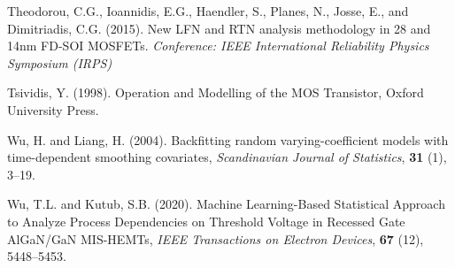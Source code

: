 \documentclass[sn-mathphys]{sn-jnl}%
\theoremstyle{thmstyleone}%
\theoremstyle{thmstyletwo}%
\theoremstyle{thmstylethree}%
\begin{document}
\begin{thebibliography}{00}
	
	 Theodorou, C.G., Ioannidis, E.G., Haendler, S., Planes, N., Josse, E., and Dimitriadis, C.G. (2015). New LFN and RTN analysis methodology in 28 and 14nm FD-SOI MOSFETs. {\it Conference: IEEE International Reliability Physics Symposium (IRPS)}
	
	
	 Tsividis, Y. (1998). Operation and Modelling of the MOS Transistor, Oxford University Press.
	
	 Wu, H. and Liang, H. (2004). Backfitting random varying-coefficient models with time-dependent smoothing covariates, {\it Scandinavian Journal of Statistics}, {\bf 31} (1), 3--19.
	
	 Wu, T.L. and Kutub, S.B. (2020). Machine Learning-Based Statistical Approach to Analyze Process Dependencies on Threshold Voltage in Recessed Gate AlGaN/GaN MIS-HEMTs, {\it IEEE Transactions on Electron Devices}, {\bf 67} (12), 5448--5453.
	
	
\end{thebibliography}
\end{document}
